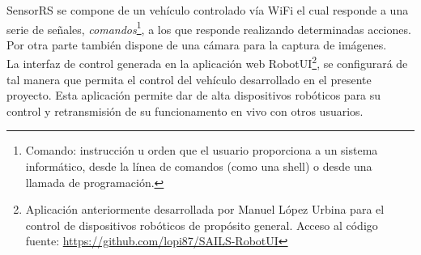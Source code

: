 SensorRS se compone de un vehículo controlado vía WiFi el cual responde a una serie de señales, \emph{comandos}\footnote{ Comando: instrucción u orden que el usuario proporciona a un sistema informático, 
desde la línea de comandos (como una shell) o desde una llamada de programación.}, a los que responde realizando determinadas acciones. Por otra parte también dispone de una cámara para la captura de imágenes.\\

La interfaz de control generada en la aplicación web RobotUI\footnote{ Aplicación anteriormente desarrollada por Manuel López Urbina para el control de dispositivos robóticos de propósito general. Acceso al 
código fuente: \url{https://github.com/lopi87/SAILS-RobotUI}}, se configurará de tal manera que permita el control del vehículo desarrollado en el presente proyecto. 
Esta aplicación permite dar de alta dispositivos robóticos para su control y retransmisión de su funcionamento en vivo con otros usuarios.\\


